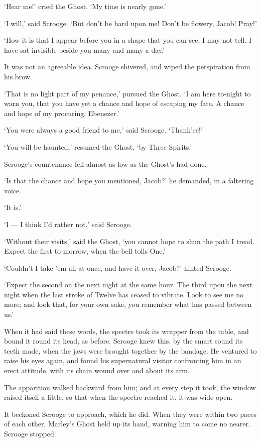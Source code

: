 \documentclass[11pt,twoside]{article}\makeatletter
\begin{document}
‘Hear me!’ cried the Ghost. ‘My time is nearly gone.’\par
‘I will,’ said Scrooge. ‘But don't be hard upon me! Don't be flowery, Jacob! Pray!’\par
‘How it is that I appear before you in a shape that you can see, I may not tell. I have sat invisible beside you many and many a day.’\par
It was not an agreeable idea. Scrooge shivered, and wiped the perspiration from his brow. \par
‘That is no light part of my penance,’ pursued the Ghost. ‘I am here to-night to warn you, that you have yet a chance and hope of escaping my fate. A chance and hope of my procuring, Ebenezer.’\par
‘You were always a good friend to me,’ said Scrooge. ‘Thank'ee!’\par
‘You will be haunted,’ resumed the Ghost, ‘by Three Spirits.’\par
Scrooge's countenance fell almost as low as the Ghost's had done. \par
‘Is that the chance and hope you mentioned, Jacob?’ he demanded, in a faltering voice.\par
‘It is.’\par
‘I — I think I'd rather not,’ said Scrooge. \par
‘Without their visits,’ said the Ghost, ‘you cannot hope to shun the path I tread. Expect the first to-morrow, when the bell tolls One.’\par
‘Couldn't I take 'em all at once, and have it over, Jacob?’ hinted Scrooge.\par
‘Expect the second on the next night at the same hour. The third upon the next night when the last stroke of Twelve has ceased to vibrate. Look to see me no more; and look that, for your own sake, you remember what has passed between us.’\par
When it had said these words, the spectre took its wrapper from the table, and bound it round its head, as before. Scrooge knew this, by the smart sound its teeth made, when the jaws were brought together by the bandage. He ventured to raise his eyes again, and found his supernatural visitor confronting him in an erect attitude, with its chain wound over and about its arm. \par
The apparition walked backward from him; and at every step it took, the window raised itself a little, so that when the spectre reached it, it was wide open. \par
It beckoned Scrooge to approach, which he did.  When they were within two paces of each other, Marley's Ghost held up its hand, warning him to come no nearer. Scrooge stopped.\par
\end{document}
